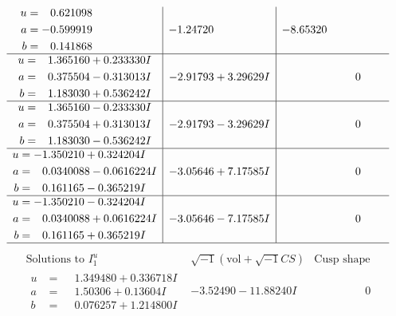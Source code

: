 \documentclass[1p]{elsarticle_modified}
\theoremstyle{definition}
\newcommand{\I}{\sqrt{-1}}
\begin{document}
$$\begin{array}{c|c|c}
\begin{aligned}
u &= \phantom{-}0.621098\phantom{ +0.000000I} \\
a &= -0.599919\phantom{ +0.000000I} \\
b &= \phantom{-}0.141868\phantom{ +0.000000I}\end{aligned}
 & -1.24720\phantom{ +0.000000I} & -8.65320\phantom{ +0.000000I} \\ \hline\begin{aligned}
u &= \phantom{-}1.365160 + 0.233330 I \\
a &= \phantom{-}0.375504 - 0.313013 I \\
b &= \phantom{-}1.183030 + 0.536242 I\end{aligned}
 & -2.91793 + 3.29629 I & \phantom{-0.000000 } 0 \\ \hline\begin{aligned}
u &= \phantom{-}1.365160 - 0.233330 I \\
a &= \phantom{-}0.375504 + 0.313013 I \\
b &= \phantom{-}1.183030 - 0.536242 I\end{aligned}
 & -2.91793 - 3.29629 I & \phantom{-0.000000 } 0 \\ \hline\begin{aligned}
u &= -1.350210 + 0.324204 I \\
a &= \phantom{-}0.0340088 - 0.0616224 I \\
b &= \phantom{-}0.161165 - 0.365219 I\end{aligned}
 & -3.05646 + 7.17585 I & \phantom{-0.000000 } 0 \\ \hline\begin{aligned}
u &= -1.350210 - 0.324204 I \\
a &= \phantom{-}0.0340088 + 0.0616224 I \\
b &= \phantom{-}0.161165 + 0.365219 I\end{aligned}
 & -3.05646 - 7.17585 I & \phantom{-0.000000 } 0\\
 \hline 
 \end{array}$$\newpage$$\begin{array}{c|c|c}  
\text{Solutions to }I^u_{1}& \I (\text{vol} + \sqrt{-1}CS) & \text{Cusp shape}\\
 \hline 
\begin{aligned}
u &= \phantom{-}1.349480 + 0.336718 I \\
a &= \phantom{-}1.50306 + 0.13604 I \\
b &= \phantom{-}0.076257 + 1.214800 I\end{aligned}
 & -3.52490 - 11.88240 I & \phantom{-0.000000 } 0 \\ \hline\begin{aligned}

\end{aligned}
\end{array}$$
\end{document}
